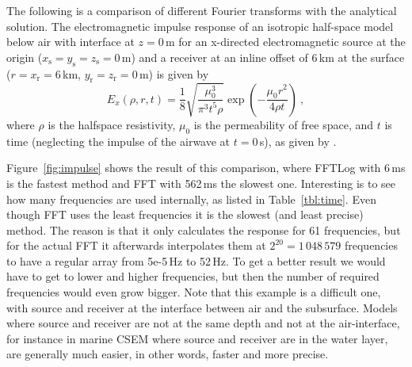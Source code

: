 \documentclass[paper]{geophysics}
\begin{document}
The following is a comparison of different Fourier transforms with the
analytical solution. The electromagnetic impulse response of an isotropic
half-space model below air with interface at $z=0\,$m for an x-directed
electromagnetic source at the origin
($x_\textrm{s}=y_\textrm{s}=z_\textrm{s}=0\,$m) and a receiver at an inline
offset of 6\,km at the surface ($r = x_\textrm{r}=6\,$km,
$y_\textrm{r}=z_\textrm{r}=0\,$m) is given by
%
\begin{equation}
  E_x(\rho,r,t) = \frac{1}{8} \sqrt{\frac{\mu_0^3}{\pi^3 t^5 \rho}}
                    \exp\left(-\frac{\mu_0 r^2}{4\rho t}\right)\ ,
  \label{eq:impulse}
\end{equation}
%
where $\rho$ is the halfspace resistivity, $\mu_0$ is the permeability of free
space, and $t$ is time (neglecting the impulse of the airwave at $t=0\,$s), as
given by \citet[][ eq. 5.38]{PhD.97.Wilson}.

Figure~\ref{fig:impulse} shows the result of this comparison, where FFTLog with
6\,ms is the fastest method and FFT with 562\,ms the slowest one. Interesting
is to see how many frequencies are used internally, as listed in
Table~\ref{tbl:time}.
%
%
%
Even though FFT uses the least frequencies it is the slowest (and least
precise) method. The reason is that it only calculates the response for 61
frequencies, but for the actual FFT it afterwards interpolates them at $2^{20}
= 1\,048\,579$ frequencies to have a regular array from 5e-5\,Hz to 52\,Hz. To
get a better result we would have to get to lower and higher frequencies, but
then the number of required frequencies would even grow bigger. Note that this
example is a difficult one, with source and receiver at the interface between
air and the subsurface. Models where source and receiver are not at the same
depth and not at the air-interface, for instance in marine CSEM where source
and receiver are in the water layer, are generally much easier, in other words,
faster and more precise.
%
%
\end{document}
